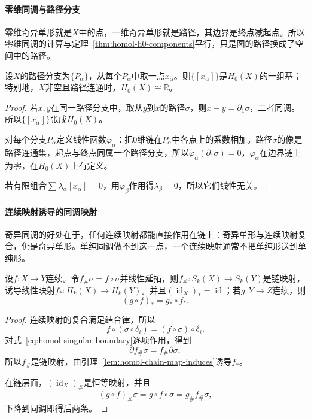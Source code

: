 \paragraph{零维同调与路径分支}
零维奇异单形就是$X$中的点，一维奇异单形就是路径，其边界是终点减起点。所以零维同调的计算与定理~\ref{thm:homol-h0-components}平行，只是图的路径换成了空间中的路径。

\begin{theorem}[零维奇异同调计数路径分支]
\label{thm:homol-singular-h0}
设$X$的路径分支为$\{P_\alpha\}$，从每个$P_\alpha$中取一点$x_\alpha$。则$\{[x_\alpha]\}$是$H_0(X)$的一组基；特别地，$X$非空且路径连通时，$H_0(X)\cong\mathbb R$。
\end{theorem}

\begin{proof}
若$x,y$在同一路径分支中，取从$y$到$x$的路径$\sigma$，则$x-y=\partial_1\sigma$，二者同调。所以$\{[x_\alpha]\}$张成$H_0(X)$。

对每个分支$P_\alpha$定义线性函数$\varphi_\alpha$：把$0$维链在$P_\alpha$中各点上的系数相加。路径$\sigma$的像是路径连通集，起点与终点同属一个路径分支，所以$\varphi_\alpha(\partial_1\sigma)=0$，$\varphi_\alpha$在边界链上为零，在$H_0(X)$上有定义。

若有限组合$\sum\lambda_\alpha[x_\alpha]=0$，用$\varphi_\beta$作用得$\lambda_\beta=0$，所以它们线性无关。
\end{proof}

\paragraph{连续映射诱导的同调映射}
奇异同调的好处在于，任何连续映射都能直接作用在链上：奇异单形与连续映射复合，仍是奇异单形。单纯同调做不到这一点，一个连续映射通常不把单纯形送到单纯形。

\begin{theorem}[连续映射诱导同调映射]
\label{thm:homol-induced-map}
设$f:X\to Y$连续。令$f_\#\sigma=f\circ\sigma$并线性延拓，则$f_\#:S_k(X)\to S_k(Y)$是链映射，诱导线性映射$f_*:H_k(X)\to H_k(Y)$。并且$(\operatorname{id}_X)_*=\operatorname{id}$；若$g:Y\to Z$连续，则
\begin{equation}
 (g\circ f)_*=g_*\circ f_*.
 \label{eq:homol-functoriality}
\end{equation}
\end{theorem}

\begin{proof}
连续映射的复合满足结合律，所以
\[
 f\circ(\sigma\circ\delta_i)=(f\circ\sigma)\circ\delta_i.
\]
对式~\eqref{eq:homol-singular-boundary}逐项作用，得到
\[
 \partial f_\#\sigma=f_\#\partial\sigma,
\]
所以$f_\#$是链映射，由引理~\ref{lem:homol-chain-map-induces}诱导$f_*$。

在链层面，$(\operatorname{id}_X)_\#$是恒等映射，并且
\[
 (g\circ f)_\#\sigma=g\circ f\circ\sigma=g_\#f_\#\sigma,
\]
下降到同调即得后两条。
\end{proof}

